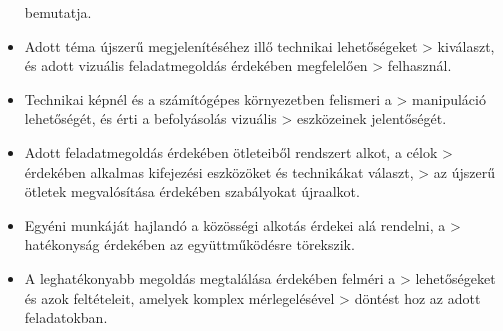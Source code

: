 \begin{itemize}
  bemutatja.
\item
  Adott téma újszerű megjelenítéséhez illő technikai lehetőségeket
  \textgreater{} kiválaszt, és adott vizuális feladatmegoldás érdekében
  megfelelően \textgreater{} felhasznál.
\item
  Technikai képnél és a számítógépes környezetben felismeri a
  \textgreater{} manipuláció lehetőségét, és érti a befolyásolás
  vizuális \textgreater{} eszközeinek jelentőségét.
\item
  Adott feladatmegoldás érdekében ötleteiből rendszert alkot, a célok
  \textgreater{} érdekében alkalmas kifejezési eszközöket és technikákat
  választ, \textgreater{} az újszerű ötletek megvalósítása érdekében
  szabályokat újraalkot.
\item
  Egyéni munkáját hajlandó a közösségi alkotás érdekei alá rendelni, a
  \textgreater{} hatékonyság érdekében az együttműködésre törekszik.
\item
  A leghatékonyabb megoldás megtalálása érdekében felméri a
  \textgreater{} lehetőségeket és azok feltételeit, amelyek komplex
  mérlegelésével \textgreater{} döntést hoz az adott feladatokban.
\end{itemize}
